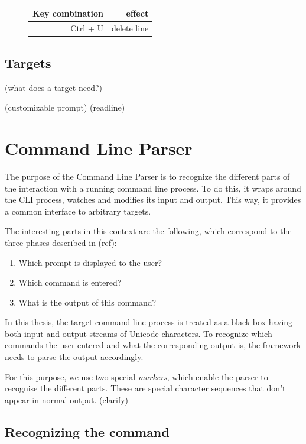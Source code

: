 \documentclass[a4paper,twoside,abstract=on,cleardoublepage=empty,numbers=noenddot,toc=bib]{scrreprt}
\begin{document}
\begin{figure}
    \begin{tabular}{r|r}
        Key combination & effect \\
        \hline
        Ctrl + U & delete line \\
    \end{tabular}
\end{figure}

\section{Targets}

(what does a target need?)

(customizable prompt)
(readline)

\chapter{Command Line Parser}

The purpose of the Command Line Parser is to recognize the different parts of the interaction with a running command line process. To do this, it wraps around the \textsc{CLI} process, watches and modifies its input and output. This way, it provides a common interface to arbitrary targets.

The interesting parts in this context are the following, which correspond to the three phases described in (ref):

\begin{enumerate}
    \item Which prompt is displayed to the user?
    \item Which command is entered?
    \item What is the output of this command?
\end{enumerate}

In this thesis, the target command line process is treated as a black box having both input and output streams of Unicode characters. To recognize which commands the user entered and what the corresponding output is, the framework needs to parse the output accordingly.

For this purpose, we use two special \emph{markers}, which enable the parser to recognise the different parts. These are special character sequences that don't appear in normal output. (clarify)

\section{Recognizing the command}
\end{document}
